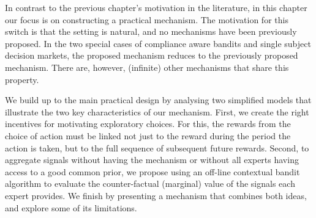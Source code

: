  


In contrast to the previous chapter's motivation in the literature, in this chapter our focus is on constructing a practical mechanism. 
The motivation for this switch is that the setting is natural, and no mechanisms have been previously proposed.
In the two special cases of compliance aware bandits and single subject decision markets, the proposed mechanism reduces to the previously proposed mechanism.
There are, however, (infinite) other mechanisms that share this property. 

We build up to the main practical design by analysing two simplified models that illustrate the two key characteristics of our mechanism. 
First, we create the right incentives for motivating exploratory choices.
For this, the rewards from the choice of action must be linked not just to the reward during the period the action is taken, but to the full sequence of subsequent future rewards.
Second, to aggregate signals without having the mechanism or without all experts having access to a good common prior, we propose using an off-line contextual bandit algorithm to evaluate the counter-factual (marginal) value of the signals each expert provides.
We finish by presenting a mechanism that combines both ideas, and explore some of its limitations.











